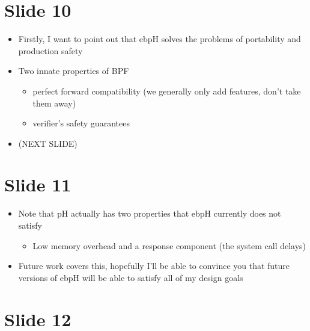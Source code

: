 \documentclass[
  12pt]{findlay}
\providecommand{\tightlist}{\setlength{\itemsep}{0pt}\setlength{\parskip}{0pt}}
\begin{document}
\hypertarget{slide-10}{%
\section{Slide 10}\label{slide-10}}

\begin{itemize}
\tightlist
\item
  Firstly, I want to point out that ebpH solves the problems of
  portability and production safety
\item
  Two innate properties of BPF

  \begin{itemize}
  \tightlist
  \item
    perfect forward compatibility (we generally only add features, don't
    take them away)
  \item
    verifier's safety guarantees
  \end{itemize}
\item
  (NEXT SLIDE)
\end{itemize}

\hypertarget{slide-11}{%
\section{Slide 11}\label{slide-11}}

\begin{itemize}
\tightlist
\item
  Note that pH actually has two properties that ebpH currently does not
  satisfy

  \begin{itemize}
  \tightlist
  \item
    Low memory overhead and a response component (the system call
    delays)
  \end{itemize}
\item
  Future work covers this, hopefully I'll be able to convince you that
  future versions of ebpH will be able to satisfy all of my design goals
\end{itemize}

\hypertarget{slide-12}{%
\section{Slide 12}\label{slide-12}}
\end{document}
